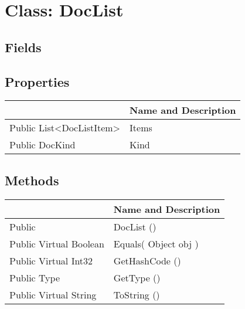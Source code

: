 \documentclass[11pt, oneside, a4paper]{book}
\begin{document}
\hypertarget{SoftwareEngineeringTools.{}Documentation.{}DocList}{}
\section{Class: DocList}

\subsection{Fields}

\subsection{Properties}
\begin{center}
\begin{tabular}{| p{3cm} | p{12cm} | }
\hline
\textbf{ } & \textbf{ Name and Description}\\
\hline
 Public  List<DocListItem> &  Items\hypertarget{SoftwareEngineeringTools.{}Documentation.{}DocList.{}Items}{}\\
\hline
 Public  DocKind &  Kind\hypertarget{SoftwareEngineeringTools.{}Documentation.{}DocList.{}Kind}{}\\
\hline
\end{tabular}
\end{center}

\subsection{Methods}
\begin{center}
\begin{tabular}{| p{3cm} | p{12cm} | }
\hline
\textbf{ } & \textbf{ Name and Description}\\
\hline
 Public  &  DocList ()\hypertarget{SoftwareEngineeringTools.{}Documentation.{}DocList.{}DocList}{}\\
\hline
 Public  Virtual  Boolean &  Equals(\hypertarget{SoftwareEngineeringTools.{}Documentation.{}DocList.{}Equals\_Object}{} Object  obj  )\\
\hline
 Public  Virtual  Int32 &  GetHashCode ()\hypertarget{SoftwareEngineeringTools.{}Documentation.{}DocList.{}GetHashCode}{}\\
\hline
 Public  Type &  GetType ()\hypertarget{SoftwareEngineeringTools.{}Documentation.{}DocList.{}GetType}{}\\
\hline
 Public  Virtual  String &  ToString ()\hypertarget{SoftwareEngineeringTools.{}Documentation.{}DocList.{}ToString}{}\\
\hline
\end{tabular}
\end{center}
 
\end{document}
